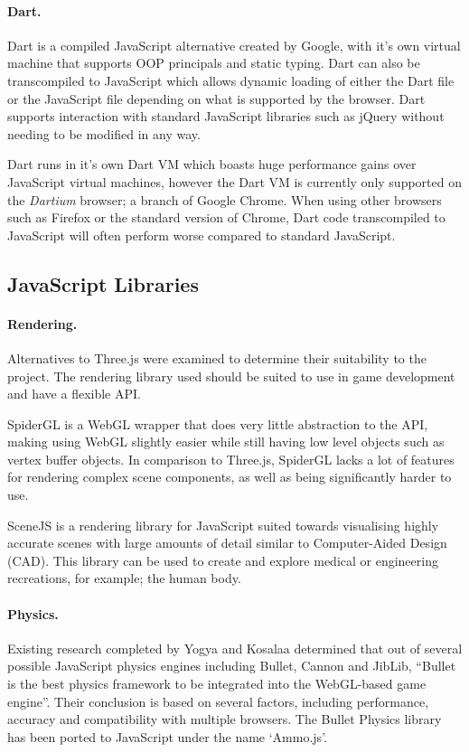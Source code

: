 \paragraph{Dart.}
Dart is a compiled JavaScript alternative created by Google, with it's own virtual machine that supports OOP principals and static typing. Dart can also be transcompiled to JavaScript which allows dynamic loading of either the Dart file or the JavaScript file depending on what is supported by the browser.\cite{dart} Dart supports interaction with standard JavaScript libraries such as jQuery without needing to be modified in any way.

Dart runs in it's own Dart VM which boasts huge performance gains over JavaScript virtual machines, however the Dart VM is currently only supported on the \emph{Dartium} browser; a branch of Google Chrome. When using other browsers such as Firefox or the standard version of Chrome, Dart code transcompiled to JavaScript will often perform worse compared to standard JavaScript.\cite{dartperformance}

\subsection{JavaScript Libraries}

\paragraph{Rendering.}
Alternatives to Three.js were examined to determine their suitability to the project. The rendering library used should be suited to use in game development and have a flexible API.

SpiderGL is a WebGL wrapper that does very little abstraction to the API, making using WebGL slightly easier while still having low level objects such as vertex buffer objects.\cite{spidergl} In comparison to Three.js, SpiderGL lacks a lot of features for rendering complex scene components, as well as being significantly harder to use.

SceneJS is a rendering library for JavaScript suited towards visualising highly accurate scenes with large amounts of detail similar to Computer-Aided Design (CAD). This library can be used to create and explore medical or engineering recreations, for example; the human body.\cite{scenejs}

\paragraph{Physics.}
Existing research completed by Yogya and Kosalaa determined that out of several possible JavaScript physics engines including Bullet, Cannon and JibLib, ``Bullet is the best physics framework to be integrated into the WebGL-based game engine''.\cite{yogya2014comparison} Their conclusion is based on several factors, including performance, accuracy and compatibility with multiple browsers. The Bullet Physics library has been ported to JavaScript under the name `Ammo.js'.

